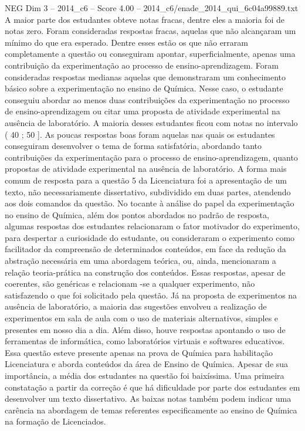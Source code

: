 \begin{textsample}{NEG Dim 3 – 2014\_c6 – Score 4.00 – 2014\_c6/enade\_2014\_qui\_6c04a99889.txt}
A maior parte dos estudantes obteve notas fracas, dentre eles a maioria foi de notas zero.
Foram consideradas respostas fracas, aquelas que não alcançaram um mínimo do que era esperado.
Dentre esses estão os que não erraram completamente a questão ou conseguiram apontar, superficialmente, apenas uma contribuição da experimentação ao processo de ensino-aprendizagem.
Foram consideradas respostas medianas aquelas que demonstraram um conhecimento básico sobre a experimentação no ensino de Química.
Nesse caso, o estudante conseguiu abordar ao menos duas contribuições da experimentação no processo de ensino-aprendizagem ou citar uma proposta de atividade experimental na ausência de laboratório.
A maioria desses estudantes ficou com notas no intervalo ( 40 ; 50 ].
As poucas respostas boas foram aquelas nas quais os estudantes conseguiram desenvolver o tema de forma satisfatória, abordando tanto contribuições da experimentação para o processo de ensino-aprendizagem, quanto propostas de atividade experimental na ausência de laboratório.
A forma mais comum de resposta para a questão 5 da Licenciatura foi a apresentação de um texto, não necessariamente dissertativo, subdividido em duas partes, atendendo aos dois comandos da questão.
No tocante à análise do papel da experimentação no ensino de Química, além dos pontos abordados no padrão de resposta, algumas respostas dos estudantes relacionaram o fator motivador do experimento, para despertar a curiosidade do estudante, ou consideraram o experimento como facilitador da compreensão de determinados conteúdos, em face da redução da abstração necessária em uma abordagem teórica, ou, ainda, mencionaram a relação teoria-prática na construção dos conteúdos.
Essas respostas, apesar de coerentes, são genéricas e relacionam -se a qualquer experimento, não satisfazendo o que foi solicitado pela questão.
Já na proposta de experimentos na ausência de laboratório, a maioria das sugestões envolveu a realização de experimentos em sala de aula com o uso de materiais alternativos, simples e presentes em nosso dia a dia.
Além disso, houve respostas apontando o uso de ferramentas de informática, como laboratórios virtuais e softwares educativos.
Essa questão esteve presente apenas na prova de Química para habilitação Licenciatura e aborda conteúdos da área de Ensino de Química.
Apesar de sua importância, a média dos estudantes na questão foi baixíssima.
Uma primeira constatação a partir da correção é que há dificuldade por parte dos estudantes em desenvolver um texto dissertativo.
As baixas notas também podem indicar uma carência na abordagem de temas referentes especificamente ao ensino de Química na formação de Licenciados.

\end{textsample}
